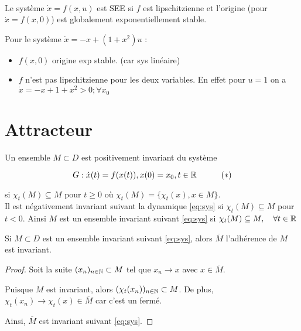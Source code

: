 \documentclass[main.tex]{subfiles} \newcommand{\D}{\mathcal{D}}
\begin{document}
\begin{thm} ~\\  Le système $\dot{x}= f(x,u)$ est
SEE si $f$ est lipschitzienne et l'origine (pour $\dot{x}=f(x,0)$) est
globalement exponentiellement stable.  \end{thm}

\begin{exemple} Pour le système $\dot{x} = -x+(1+x^2)u$ : \begin{itemize} \item
		$f(x,0)$ origine exp stable. (car sys linéaire) \item $f$ n'est pas
			lipschitzienne pour les deux variables. En effet pour $u=1$ on a
			$\dot{x} = -x+1+x^2 > 0; \forall x_0$ \end{itemize} \end{exemple}



\section{Attracteur} \begin{defin} Un ensemble $M \subset D$ est positivement
	invariant du système

  \begin{equation}\label{eq:sys} G:\dot{x}(t) = f(x(t)), x(0) = x_0, t\in \mathbb{R}
  \quad \tag{$\ast$} \end{equation}


  si $\chi_t(M) \subseteq M$ pour $t\geq 0$ où $\chi_t(M) = \{ \chi_t(x), x\in
	M \}$.\\

  Il est négativement invariant suivant la dynamique \eqref{eq:sys}   si
$\chi_t(M) \subseteq M$ pour $t<0$. Ainsi $M$ est un ensemble invariant suivant
\eqref{eq:sys} si $\chi_t(M) \subseteq M, \quad \forall t \in \mathbb{R}$ \end{defin}

\begin{prop} Si $M \subset D$ est un ensemble invariant suivant \eqref{eq:sys},
alors $\overline{M}$ l'adhérence de $M$ est invariant.  \end{prop}

\begin{proof} Soit la suite $(x_n)_{n\in\mathbb{N}} \subset M$ tel que $x_n \rightarrow
	x$ avec $x\in \overline{M}$.

  Puisque $M$ est invariant, alors $(\chi_t(x_n))_{n\in\mathbb{N}} \subset M$. De plus,
	$\chi_t(x_n) \rightarrow \chi_t(x) \in \overline{M}$ car c'est un fermé.

  Ainsi, $\overline{M}$ est invariant suivant \eqref{eq:sys}.  \end{proof}
\end{document}
